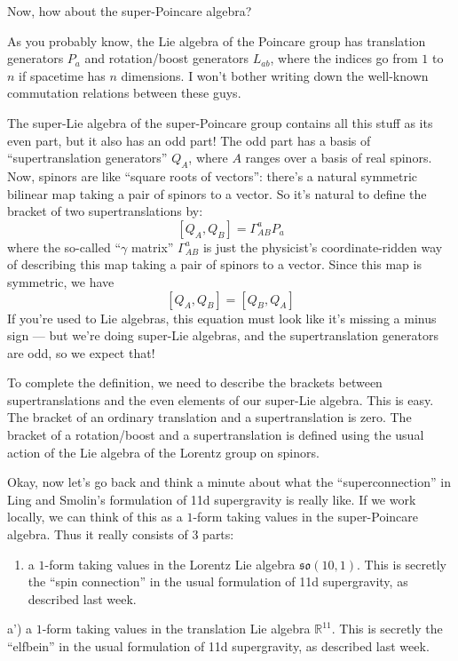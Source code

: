 \documentclass{article}
\def\tightlist{}
\begin{document}
Now, how about the super-Poincare algebra?

As you probably know, the Lie algebra of the Poincare group has
translation generators \(P_a\) and rotation/boost generators \(L_{ab}\),
where the indices go from \(1\) to \(n\) if spacetime has \(n\)
dimensions. I won't bother writing down the well-known commutation
relations between these guys.

The super-Lie algebra of the super-Poincare group contains all this
stuff as its even part, but it also has an odd part! The odd part has a
basis of ``supertranslation generators'' \(Q_A\), where \(A\) ranges
over a basis of real spinors. Now, spinors are like ``square roots of
vectors'': there's a natural symmetric bilinear map taking a pair of
spinors to a vector. So it's natural to define the bracket of two
supertranslations by: \[[Q_A,Q_B] = \Gamma_{AB}^a P_a\] where the
so-called ``\(\gamma\) matrix'' \(\Gamma_{AB}^a\) is just the
physicist's coordinate-ridden way of describing this map taking a pair
of spinors to a vector. Since this map is symmetric, we have
\[[Q_A,Q_B] = [Q_B,Q_A]\] If you're used to Lie algebras, this equation
must look like it's missing a minus sign --- but we're doing super-Lie
algebras, and the supertranslation generators are odd, so we expect
that!

To complete the definition, we need to describe the brackets between
supertranslations and the even elements of our super-Lie algebra. This
is easy. The bracket of an ordinary translation and a supertranslation
is zero. The bracket of a rotation/boost and a supertranslation is
defined using the usual action of the Lie algebra of the Lorentz group
on spinors.

Okay, now let's go back and think a minute about what the
``superconnection'' in Ling and Smolin's formulation of 11d supergravity
is really like. If we work locally, we can think of this as a \(1\)-form
taking values in the super-Poincare algebra. Thus it really consists of
3 parts:

\begin{enumerate}
\def\labelenumi{\alph{enumi})}
\tightlist
\item
  a \(1\)-form taking values in the Lorentz Lie algebra
  \(\mathfrak{so}(10,1)\). This is secretly the ``spin connection'' in
  the usual formulation of 11d supergravity, as described last week.
\end{enumerate}

a') a \(1\)-form taking values in the translation Lie algebra
\(\mathbb{R}^{11}\). This is secretly the ``elfbein'' in the usual
formulation of 11d supergravity, as described last week.
\end{document}
